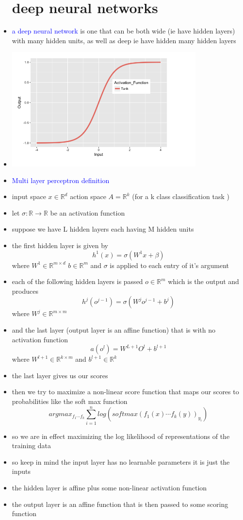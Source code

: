 \documentclass{article}
\begin{document}
\begin{itemize}
\section*{deep neural networks}
\item \textcolor{blue}{a deep neural network} is one that can be both wide (ie have hidden layers) with many hidden units, as well as deep ie have hidden many hidden layers
\item \includegraphics*[width=10cm]{images/Screenshot 2023-05-15 at 12.25.24 AM.png}
\item \textcolor{blue}{Multi layer perceptron definition}
\item input space $x\in \mathbb{R}^{d}$ action space $A=\mathbb{R}^{k}$ (for a k class classification task )
\item let $\sigma:\mathbb{R}\rightarrow \mathbb{R}$ be an activation function 
\item suppose we have L hidden layers each having M hidden units 
\item the first hidden layer is given by $$h^{1}(x)=\sigma(W^{1}x+\beta)$$ where $W^{1}\in \mathbb{R}^{m \times d}$ $b\in \mathbb{R}^{m}$ and $\sigma$ is applied to each entry of it's argument 
\item each of the following hidden layers is passed $o\in \mathbb{R}^{m}$ which is the output and produces $$h^{j}(o^{j-1})=\sigma(W^{j}o^{j-1}+b^{j})$$ where $W^{j}\in \mathbb{R}^{m\times m}$
\item and the last layer (output layer is an affine function) that is with no activation function $$a(o^l)=W^{L+1}O^l+b^{l+1}$$ where $W^{l+1}\in \mathbb{R}^{k\times m}$ and $b^{l+1}\in \mathbb{R}^{k}$
\item the last layer gives us our scores 
\item then we try to maximize a non-linear score function that maps our scores to probabilities like the soft max function $$argmax_{f_1\cdots f_k}\sum_{i=1}^{n}log(softmax(f_1(x)\cdots f_k(y))_{y_i})$$
\item so we are in effect maximizing the log likelihood of representations of the training data 
\item so keep in mind the input layer has no learnable parameters it is just the inputs 
\item the hidden layer is affine plus some non-linear activation function 
\item the output layer is an affine function that is then passed to some scoring function 

\end{itemize}
\end{document}
